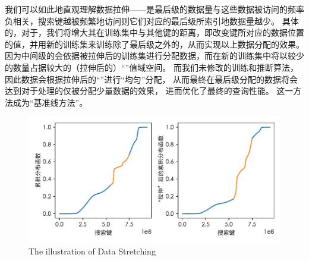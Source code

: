 我们可以如此地直观理解数据拉伸{------}是{\rmi}最后级{\model}的数据量与这些数据被访问的频率负相关，搜索键越被频繁地访问则它们对应的{\rmi}最后级{\model}所索引地数据量越少。
具体的，对于{\hotkey}，我们将增大其在训练集中与其他键的距离，即改变键所对应的数据位置的值，并用新的训练集来训练除了最后级之外的{\model}，从而实现以上数据分配的效果。
因为中间级的{\model}会依据被拉伸后的训练集进行分配数据，而在新的训练集中{\hotkey}将以较少的数量占据较大的（拉伸后的）“{\cdf}”值域空间。
而我们未修改{\rmi}的训练和推断算法，因此数据会根据拉伸后的“{\cdf}”进行“均匀”分配，
从而最终在最后级分配的数据将会达到对于处理{\hotkey}的{\model}仅被分配少量数据的效果，
进而优化了最终{\hotkey}的查询性能。
这一方法成为“基准线方法”。


\begin{figure}[!htp]
  \centering
  \includegraphics{figure/stretching.pdf}
    {The illustration of Data Stretching}
  \label{fig:stretch-illus}
\end{figure}

